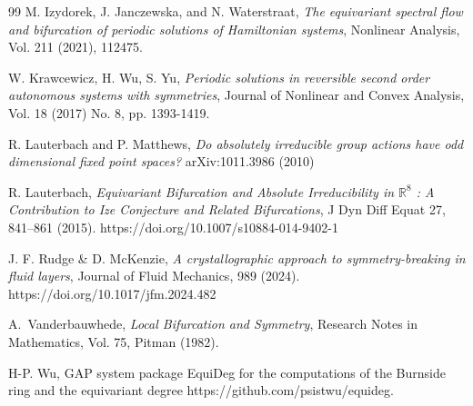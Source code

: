 \documentclass[twoside]{article}%
\begin{document}
\begin{thebibliography}{99}
M. Izydorek, J. Janczewska, and N. Waterstraat, \emph{The equivariant spectral flow and bifurcation of periodic solutions of Hamiltonian systems}, Nonlinear Analysis, Vol. 211 (2021), 112475.


 W. Krawcewicz, H. Wu, S. Yu, {\it Periodic solutions in reversible second order autonomous systems with symmetries}, Journal of Nonlinear and Convex Analysis, Vol. 18 (2017) No. 8, pp. 1393-1419.

 R. Lauterbach and P. Matthews, \emph{Do absolutely irreducible group actions have odd dimensional fixed point spaces?} arXiv:1011.3986 (2010)

 R. Lauterbach, \emph{Equivariant Bifurcation and Absolute Irreducibility in $\mathbb R^8$
: A Contribution to Ize Conjecture and Related Bifurcations}, J Dyn Diff Equat 27, 841–861 (2015). https://doi.org/10.1007/s10884-014-9402-1

 J. F. Rudge \& D. McKenzie,  \emph{A crystallographic approach to symmetry-breaking in fluid layers}, Journal of Fluid Mechanics, 989 (2024). https://doi.org/10.1017/jfm.2024.482

 A.~Vanderbauwhede, \emph{Local Bifurcation and Symmetry}, Research Notes in Mathematics, Vol. 75, Pitman (1982).

 H-P. Wu, GAP system package EquiDeg for the computations of the Burnside ring and the equivariant
degree https://github.com/psistwu/equideg.

\end{thebibliography} 
\end{document}
